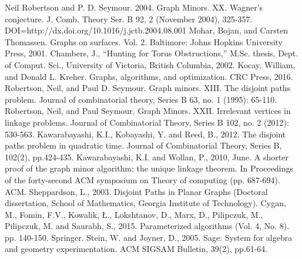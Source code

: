 \documentclass[12pt,conference]{IEEEtran}
\begin{document}
\begin{thebibliography}{1}
 Neil Robertson and P. D. Seymour. 2004. Graph Minors. XX. Wagner's conjecture. J. Comb. Theory Ser. B 92, 2 (November 2004), 325-357. DOI=http://dx.doi.org/10.1016/j.jctb.2004.08.001 
 Mohar, Bojan, and Carsten Thomassen. Graphs on surfaces. Vol. 2. Baltimore: Johns Hopkins University Press, 2001.
 Chambers, J., “Hunting for Torus Obstructions,” M.Sc. thesis, Dept. of Comput. Sci., University of Victoria, British Columbia, 2002.
 Kocay, William, and Donald L. Kreher. Graphs, algorithms, and optimization. CRC Press, 2016.
 Robertson, Neil, and Paul D. Seymour. Graph minors. XIII. The disjoint paths problem. Journal of combinatorial theory, Series B 63, no. 1 (1995): 65-110.
 Robertson, Neil, and Paul Seymour. Graph Minors. XXII. Irrelevant vertices in linkage problems. Journal of Combinatorial Theory, Series B 102, no. 2 (2012): 530-563.
 Kawarabayashi, K.I., Kobayashi, Y. and Reed, B., 2012. The disjoint paths problem in quadratic time. Journal of Combinatorial Theory, Series B, 102(2), pp.424-435.
 Kawarabayashi, K.I. and Wollan, P., 2010, June. A shorter proof of the graph minor algorithm: the unique linkage theorem. In Proceedings of the forty-second ACM symposium on Theory of computing (pp. 687-694). ACM.
 Sheppardson, L., 2003. Disjoint Paths in Planar Graphs (Doctoral dissertation, School of Mathematics, Georgia Institute of Technology).
 Cygan, M., Fomin, F.V., Kowalik, Ł., Lokshtanov, D., Marx, D., Pilipczuk, M., Pilipczuk, M. and Saurabh, S., 2015. Parameterized algorithms (Vol. 4, No. 8). pp. 140-150. Springer.
 Stein, W. and Joyner, D., 2005. Sage: System for algebra and geometry experimentation. ACM SIGSAM Bulletin, 39(2), pp.61-64.
\end{thebibliography}
\end{document}

